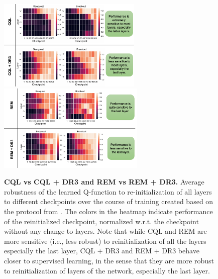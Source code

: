 \begin{figure}[h]
    \centering
    \includegraphics[width=0.612\textwidth]{figures/robustness_figures/layer_robustness_cql.pdf}
    \vspace{0.4cm}
    \includegraphics[width=0.622\textwidth]{figures/robustness_figures/rem_robustness_final.pdf}
    \vspace{-5pt}
    \caption{\footnotesize{\label{fig:robustness} \textbf{CQL vs CQL + DR3 and REM vs REM + DR3.} Average robustness of the learned Q-function to re-initialization of all layers to different checkpoints over the course of training created based on the protocol from \citet{zhang2019all}. The colors in the heatmap indicate performance of the reinitialized checkpoint, normalized w.r.t. the checkpoint without any change to layers. Note that while CQL and REM are more sensitive (i.e., less robust) to reinitialization of all the layers especially the last layer, CQL + DR3 and REM + DR3 behave closer to supervised learning, in the sense that they are more robust to reinitialization of layers of the network, especially the last layer.}}
    \vspace{-0.3cm}
\end{figure}
